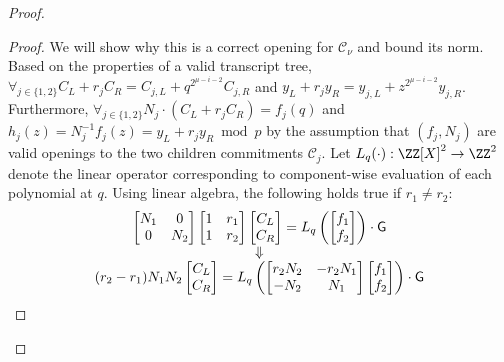 \begin{proof}
\begin{proof}
We will show why this is a correct opening for $\mathcal{C}_\nu$ and bound its norm. Based on the properties of a valid transcript tree, $\forall_{j \in \{1,2\}} C_L + r_j C_R =  C_{j,L} + q^{2^{\mu - i - 2}} C_{j,R}$ and $y_L + r_j y_R = y_{j,L} + z^{2^{\mu - i -2}} y_{j, R}$. Furthermore, $\forall_{j \in \{1,2\}} N_j \cdot (C_L + r_j C_R ) = f_j(q)$ and $h_j(z) = N_j^{-1} f_j(z) = y_L + r_j y_R \bmod p$ by the assumption that $(f_j, N_j)$ are valid openings to the two children commitments $\mathcal{C}_j$.  Let $L_q(\cdot): \ZZ[X]^2 \rightarrow \ZZ^2$ denote the linear operator corresponding to component-wise evaluation of each polynomial at $q$. Using linear algebra, the following holds true if $r_1 \neq r_2$:
\begin{equation*}
\begin{array}{c}
\begin{bmatrix}
N_1 & 0 \\
0 & N_2 \\
\end{bmatrix} 
\begin{bmatrix}
1 & r_1 \\
1 & r_2 \\
\end{bmatrix} 
\begin{bmatrix}
C_L \\
C_R \\
\end{bmatrix} 
= 
L_q \left(
\begin{bmatrix}
f_1 \\
f_2\\
\end{bmatrix} 
\right)
 \cdot \gr{G} \\
\Downarrow\\
(r_2 - r_1) N_1 N_2 
\begin{bmatrix}
C_L \\
C_R \\
\end{bmatrix}
= 
L_q\left(
\begin{bmatrix}
r_2 N_2 & -r_2 N_1 \\
-N_2 & N_1 \\
\end{bmatrix}
\begin{bmatrix}
f_1 \\
f_2 \\
\end{bmatrix}
\right)
\cdot  \gr{G}
\end{array} 

\end{equation*}
\end{proof}
\end{proof}
